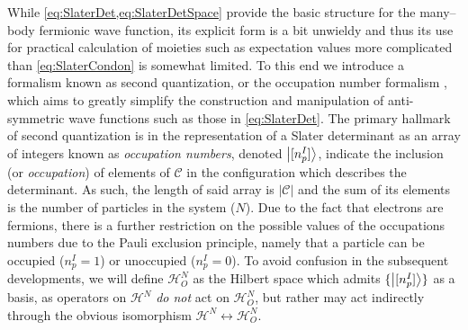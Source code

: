 While \cref{eq:SlaterDet,eq:SlaterDetSpace} provide the basic structure for the many--body fermionic wave function, its explicit form
is a bit unwieldy and thus its use for practical calculation of moieties such as expectation values more complicated than \cref{eq:SlaterCondon} 
is somewhat limited.
To this end we introduce a formalism known as second quantization, or the occupation number formalism \cite{Walecka12_book},
which aims to greatly simplify the construction and manipulation of anti-symmetric wave functions such as those in 
\cref{eq:SlaterDet}. The primary hallmark of second quantization is in the representation of a Slater determinant 
as an array of integers known as \emph{occupation numbers}, denoted $\left\vert [n_p^I] \right\rangle$, indicate the inclusion (or \emph{occupation}) of elements
of $\mathcal{C}$ in the configuration which describes the determinant. As such, the length of said array is $\vert \mathcal{C} \vert$
and the sum of its elements is the number of particles in the system ($N$). Due to the fact that electrons are fermions,
there is a further restriction on the possible values of the occupations numbers due to the Pauli exclusion principle,
namely that a particle can be occupied ($n^I_p=1$) or unoccupied ($n^I_p=0$). To avoid confusion in the subsequent developments,
we will define $\mathcal{H}^N_O$ as the Hilbert space which admits $\{\left\vert [n_p^I] \right\rangle\}$ as a basis, as operators on $\mathcal{H}^N$ 
\emph{do not} act on $\mathcal{H}^N_O$, but rather may act indirectly through the obvious isomorphism 
$\mathcal{H}^N \leftrightarrow \mathcal{H}^N_O$.

